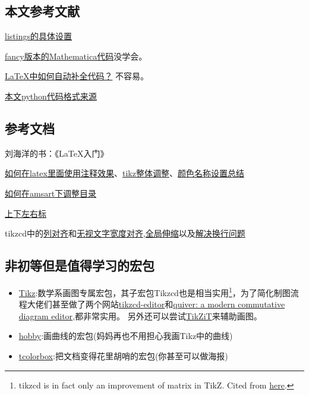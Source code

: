 \documentclass[11pt]{amsart}
\begin{document}
\subsection{本文参考文献}

 \href{http://blog.sina.com.cn/s/blog_a382a9080102z25i.html}{listings的具体设置}
  
   \href{https://tex.stackexchange.com/questions/84748/fanciest-way-to-include-mathematica-code-in-latex}{fancy版本的Mathematica代码}没学会。
           
\href{https://tex.stackexchange.com/questions/126241/autoindent-in-texmaker}{\LaTeX 中如何自动补全代码？} 不容易。

\href{https://tex.stackexchange.com/questions/235783/listings-recognize-numbers-and-1e-3}{本文python代码格式来源}

\subsection{参考文档}
刘海洋的书：《\LaTeX 入门》

\href{https://liam.page/2016/09/24/TikZ-comment-to-text/}{如何在latex里面使用注释效果}、\href{https://newbedev.com/how-of-to-change-font-size-for-every-nodes-in-tikzcd}{tikz整体调整}、\href{http://latexcolor.com/}{颜色名称设置总结}

\href{https://tex.stackexchange.com/questions/322268/table-of-contents-amsart}{如何在amsart下调整目录}

\href{https://tex.stackexchange.com/questions/11542/left-and-right-subscript-superscript}{上下左右标}

tikzcd中的\href{https://tex.stackexchange.com/questions/289295/column-alignment-in-tikzcd}{列对齐}和\href{https://tex.stackexchange.com/questions/411742/tikzcd-how-to-get-even-column-spacing}{无视文字宽度对齐},\href{https://tex.stackexchange.com/questions/325297/how-to-scale-a-tikzcd-diagram}{全局伸缩}以及\href{https://tex.stackexchange.com/questions/84945/adjustbox-ate-my-newlines}{解决换行问题}
\subsection{非初等但是值得学习的宏包}
\begin{itemize}
\item \href{https://ctan.org/pkg/pgf}{Tikz}:数学系画图专属宏包，其子宏包Tikzcd也是相当实用\footnote{tikzcd is in fact only an improvement of matrix in TikZ. Cited from \href{https://tex.stackexchange.com/questions/484743/format-single-node-in-tikzcd}{here}.}，为了简化制图流程大佬们甚至做了两个网站\href{https://tikzcd.yichuanshen.de/}{tikzcd-editor}和\href{https://q.uiver.app/}{quiver: a modern commutative diagram editor},都非常实用。 另外还可以尝试\href{https://tikzit.github.io/}{TikZiT}来辅助画图。
\item \href{https://ctan.org/pkg/hobby}{hobby}:画曲线的宏包(妈妈再也不用担心我画Tikz中的曲线)
\item \href{https://ctan.org/pkg/tcolorbox}{tcolorbox}:把文档变得花里胡哨的宏包(你甚至可以做海报)
\end{itemize}
\end{document}
